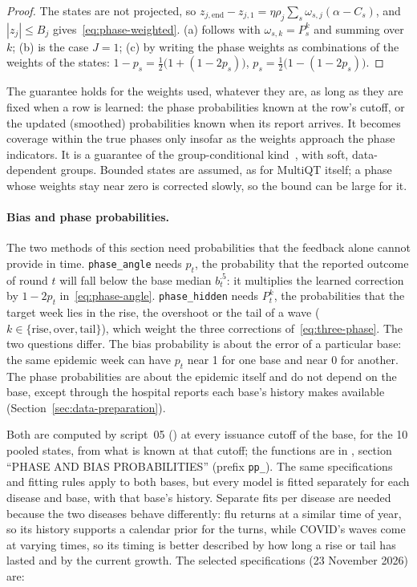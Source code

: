 \documentclass[11pt,a4paper]{article}
\theoremstyle{definition}
\theoremstyle{remark}
\begin{document}
\begin{proof}
The states are not projected, so
$z_{j,\mathrm{end}}-z_{j,1}=\eta\rho_j\sum_s\omega_{s,j}(\alpha-C_s)$, and
$|z_j|\le B_j$ gives~\eqref{eq:phase-weighted}. (a) follows with
$\omega_{s,k}=P_s^k$ and summing over $k$; (b) is the case $J=1$; (c) by
writing the phase weights as combinations of the weights of the states:
$1-p_s=\frac12\bigl(1+(1-2p_s)\bigr)$, $p_s=\frac12\bigl(1-(1-2p_s)\bigr)$.
\end{proof}

The guarantee holds for the weights used, whatever they are, as long as
they are fixed when a row is learned: the phase probabilities known at the
row's cutoff, or the updated (smoothed) probabilities known when its report
arrives. It becomes coverage within the true phases only insofar as the
weights approach the phase indicators. It is a guarantee of the
group-conditional kind~\cite{gibbs-cherian-candes,bastani2022}, with soft,
data-dependent groups. Bounded states are assumed, as for MultiQT itself; a
phase whose weights stay near zero is corrected slowly, so the bound can be
large for it.


\paragraph{Bias and phase probabilities.}
\label{sec:phase-predictors}
The two methods of this section need probabilities that the feedback alone
cannot provide in time. \texttt{phase\_angle} needs $p_t$, the probability
that the reported outcome of round $t$ will fall below the base median
$b_t^{.5}$: it multiplies the learned correction by $1-2p_t$
in~\eqref{eq:phase-angle}. \texttt{phase\_hidden} needs
$P_t^k$, the probabilities that the target week lies in the rise, the
overshoot or the tail of a wave ($k\in\{\mathrm{rise},\mathrm{over},
\mathrm{tail}\}$), which weight the three corrections
of~\eqref{eq:three-phase}. The two questions differ. The bias probability is
about the error of a particular base: the same epidemic week can have
$p_t$ near 1 for one base and near 0 for another. The phase
probabilities are about the epidemic itself and do not depend on the base,
except through the hospital reports each base's history makes available
(Section~\ref{sec:data-preparation}).

Both are computed by script~05 () at every
issuance cutoff of the base, for the 10 pooled states, from what is known
at that cutoff; the functions are in , section
``PHASE AND BIAS PROBABILITIES'' (prefix \texttt{pp\_}). The same
specifications and fitting rules apply to both bases, but every model is
fitted separately for each disease and base, with that base's history.
Separate fits per disease are needed because the two diseases behave
differently: flu returns at a similar time of year, so its history supports
a calendar prior for the turns, while COVID's waves come at varying times,
so its timing is better described by how long a rise or tail has lasted and
by the current growth. The selected specifications (23 November 2026) are:
\end{document}
